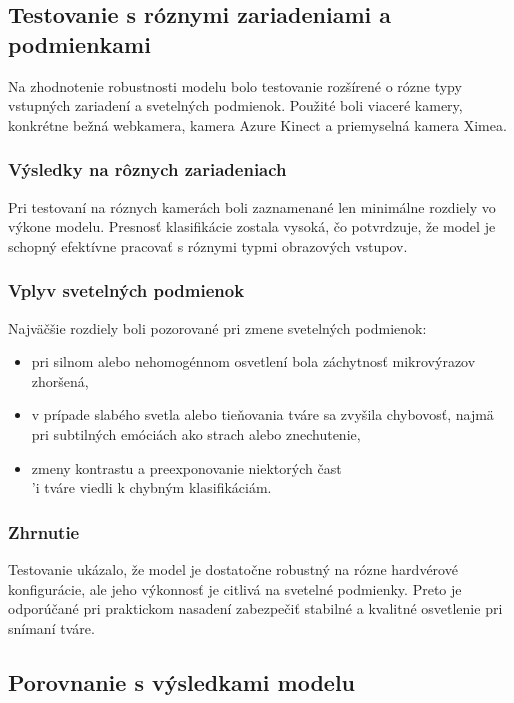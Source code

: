 \subsection{Testovanie s r\'oznymi zariadeniami a podmienkami}

Na zhodnotenie robustnosti modelu bolo testovanie roz\v{s}\'{i}ren\'e o r\'ozne typy vstupn\'ych zariaden\'i a sveteln\'ych podmienok. Pou\v{z}it\'e boli viacer\'e kamery, konkr\'etne be\v{z}n\'a webkamera, kamera Azure Kinect a priemyseln\'a kamera Ximea.

\subsubsection{Výsledky na rôznych zariadeniach}
Pri testovan\'i na r\'oznych kamer\'ach boli zaznamenan\'e len minim\'alne rozdiely vo v\'ykone modelu. Presnos\v{t} klasifik\'acie zostala vysok\'a, \v{c}o potvrdzuje, \v{z}e model je schopn\'y efekt\'ivne pracova\v{t} s r\'oznymi typmi obrazov\'ych vstupov.

\subsubsection{Vplyv svetelných podmienok}
Najv\"a\v{c}\v{s}ie rozdiely boli pozorovan\'e pri zmene sveteln\'ych podmienok:
\begin{itemize}
    \item pri silnom alebo nehomog\'ennom osvetlen\'i bola z\'achytnos\v{t} mikrov\'yrazov zhor\v{s}en\'a,
    \item v pr\'ipade slab\'eho svetla alebo tie\v{n}ovania tv\'are sa zvy\v{s}ila chybovos\v{t}, najm\"a pri subtiln\'ych em\'oci\'ach ako strach alebo znechutenie,
    \item zmeny kontrastu a preexponovanie niektor\'ych \v{c}ast\\'i tv\'are viedli k chybn\'ym klasifik\'aci\'am.
\end{itemize}

\subsubsection{Zhrnutie}
Testovanie uk\'azalo, \v{z}e model je dostato\v{c}ne robustn\'y na r\'ozne hardv\'erov\'e konfigur\'acie, ale jeho v\'ykonnos\v{t} je citliv\'a na sveteln\'e podmienky. Preto je odpor\'u\v{c}an\'e pri praktickom nasaden\'i zabezpe\v{c}i\v{t} stabiln\'e a kvalitn\'e osvetlenie pri sn\'iman\'i tv\'are.

\subsection{Porovnanie s výsledkami modelu}

